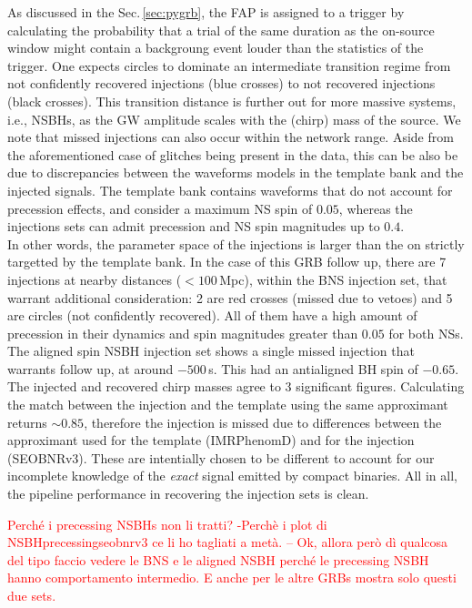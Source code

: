 \documentclass[binding=0.6cm, LaM]{sapthesis}
\newcommand{\fpg}[1]{\textcolor{red}{#1} }
\begin{document}
	As discussed in the Sec.\,\ref{sec:pygrb}, the FAP is assigned to a trigger 
	by calculating the probability that a trial of the same duration as the on-source window 
	might contain a backgroung event louder than the statistics of the trigger.
        One expects circles to dominate an intermediate transition regime from 
	not confidently recovered injections (blue crosses) to not recovered injections (black crosses).  
	This transition distance is further out for more massive systems, i.e., NSBHs, 
	as the GW amplitude scales with the (chirp) mass of the source. 
	We note that missed injections can also occur within the network range.  
	Aside from the aforementioned case of glitches being present in the data, 
	this can be also be due to discrepancies between 
	the waveforms models in the template bank and the injected signals. 
	The template bank contains waveforms that do not account for precession effects, 
	and consider a maximum NS spin of $0.05$, whereas the injections sets can admit 
	precession and NS spin magnitudes up to $0.4$.  \\
	In other words, the parameter space of the injections is larger 
	than the on strictly targetted by the template bank.
	In the case of this GRB follow up, there are 7 injections at nearby distances ($<100\,$Mpc), 
	within the BNS injection set, that warrant additional consideration: 
        2 are red crosses (missed due to vetoes) and 5 are circles (not confidently recovered).
	All of them have a high amount of precession in their dynamics and spin magnitudes greater than $0.05$ for both NSs.
	The aligned spin NSBH injection set shows a single missed injection that warrants follow up, 
	at around $-500\,$s.
	This had an antialigned BH spin of $-0.65$. 
	The injected and recovered chirp masses agree to 3 significant figures. 
	Calculating the match between the injection and the template using the same approximant returns $\sim 0.85$, 
	therefore the injection is missed due to differences between the approximant 
	used for the template (IMRPhenomD) and for the injection (SEOBNRv3).  
	These are intentially chosen to be different to account for our incomplete knowledge 
	of the \emph{exact} signal emitted by compact binaries.
        All in all, the pipeline performance in recovering the injection sets is clean.  
	
	\fpg{Perch\'e i precessing NSBHs non li tratti? -Perchè i plot di NSBHprecessingseobnrv3 ce li ho tagliati a metà. -- Ok, allora per\`o d\`i qualcosa del tipo faccio vedere le BNS e le aligned NSBH perch\'e le precessing NSBH hanno comportamento intermedio. E anche per le altre GRBs mostra solo questi due sets.}
\end{document}
